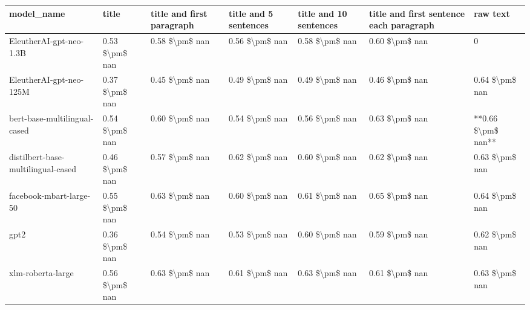 \begin{tabular}{lllllll}
\toprule
                        model\_name &          title & title and first paragraph & title and 5 sentences & title and 10 sentences & title and first sentence each paragraph &           raw text \\
\midrule
           EleutherAI-gpt-neo-1.3B & 0.53 \$\textbackslash pm\$ nan &            0.58 \$\textbackslash pm\$ nan &        0.56 \$\textbackslash pm\$ nan &         0.58 \$\textbackslash pm\$ nan &                          0.60 \$\textbackslash pm\$ nan &                  0 \\
           EleutherAI-gpt-neo-125M & 0.37 \$\textbackslash pm\$ nan &            0.45 \$\textbackslash pm\$ nan &        0.49 \$\textbackslash pm\$ nan &         0.49 \$\textbackslash pm\$ nan &                          0.46 \$\textbackslash pm\$ nan &     0.64 \$\textbackslash pm\$ nan \\
      bert-base-multilingual-cased & 0.54 \$\textbackslash pm\$ nan &            0.60 \$\textbackslash pm\$ nan &        0.54 \$\textbackslash pm\$ nan &         0.56 \$\textbackslash pm\$ nan &                          0.63 \$\textbackslash pm\$ nan & **0.66 \$\textbackslash pm\$ nan** \\
distilbert-base-multilingual-cased & 0.46 \$\textbackslash pm\$ nan &            0.57 \$\textbackslash pm\$ nan &        0.62 \$\textbackslash pm\$ nan &         0.60 \$\textbackslash pm\$ nan &                          0.62 \$\textbackslash pm\$ nan &     0.63 \$\textbackslash pm\$ nan \\
           facebook-mbart-large-50 & 0.55 \$\textbackslash pm\$ nan &            0.63 \$\textbackslash pm\$ nan &        0.60 \$\textbackslash pm\$ nan &         0.61 \$\textbackslash pm\$ nan &                          0.65 \$\textbackslash pm\$ nan &     0.64 \$\textbackslash pm\$ nan \\
                              gpt2 & 0.36 \$\textbackslash pm\$ nan &            0.54 \$\textbackslash pm\$ nan &        0.53 \$\textbackslash pm\$ nan &         0.60 \$\textbackslash pm\$ nan &                          0.59 \$\textbackslash pm\$ nan &     0.62 \$\textbackslash pm\$ nan \\
                 xlm-roberta-large & 0.56 \$\textbackslash pm\$ nan &            0.63 \$\textbackslash pm\$ nan &        0.61 \$\textbackslash pm\$ nan &         0.63 \$\textbackslash pm\$ nan &                          0.61 \$\textbackslash pm\$ nan &     0.63 \$\textbackslash pm\$ nan \\
\bottomrule
\end{tabular}
